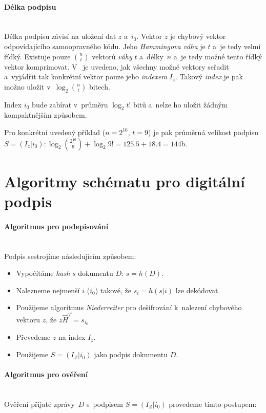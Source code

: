 \documentclass[thesis=M,czech,hidelinks]{FITthesis}[2012/06/26]
\newcommand{\0}{{\textcolor[gray]{0.75}{0}}}
\begin{document}
\paragraph{Délka podpisu} \hfil \\
Délka podpisu závisí na uložení dat $z$ a~$i_0$. Vektor $z$ je chybový vektor
odpovídajícího samoopravného kódu. Jeho \emph{Hammingova váha} je $t$ a~je tedy
velmi řídký. Existuje pouze $\binom{n}{t}$ vektorů \emph{váhy} $t$ a~délky~$n$
a~je tedy možné tento řídký vektor komprimovat. V~\cite{Courtois} je uvedeno,
jak všechny možné vektory seřadit a~vyjádřit tak konkrétní vektor pouze jeho
\emph{indexem} $I_z$. Takový \emph{index} je pak možno uložit
v~$\log_2{\binom{n}{t}}$ bitech.

Index $i_0$ bude zabírat v~průměru $\log_2{t!}$ bitů a~nelze ho uložit žádným
kompaktnějším způsobem.

Pro konkrétní uvedený příklad ($n=2^{16}$, $t=9$) je pak průměrná velikost
podpisu $S = ( I_z | i_0 ): \log_2{\binom{2^{16}}{9}} + \log_2{9!} =
125.5 + 18.4 = 144$\;b.



\section{Algoritmy schématu pro digitální podpis}


\paragraph{Algoritmus pro podepisování} \hfil \\
Podpis sestrojíme následujícím způsobem:

\begin{itemize}
    \item Vypočítáme \emph{hash} $s$ dokumentu $D$: $s = h(D)$.
    \item Nalezneme nejmenší $i$ ($i_0$) takové, že $s_i = h(s|i)$ lze dekódovat.
    \item Použijeme algoritmus \emph{Niederreiter} pro dešifrování k~nalezení
        chybového vektoru $z$, že $z\hat{H}^T = s_{i_0}$
    \item Převedeme $z$ na index $I_z$.
    \item Použijeme $S=(I_Z|i_0)$ jako podpis dokumentu $D$.
\end{itemize}


\paragraph{Algoritmus pro ověření} \hfil \\
Ověření přijaté zprávy~$D$ s~podpisem $S=(I_Z|i_0)$ provedeme tímto postupem:
\end{document}
